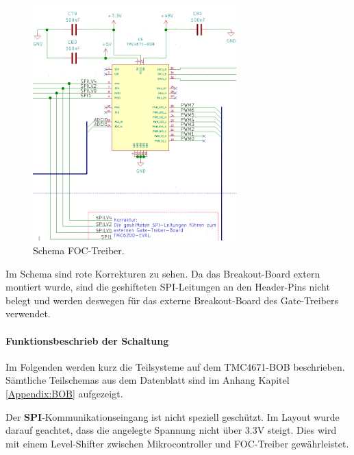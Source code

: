 \begin{figure}[H]
	\centering
	\includegraphics[width=0.7\textwidth]{graphics/Schema_FOC_Treiber}
	\caption{Schema FOC-Treiber.}
	\label{fig:Schema_FOC_Treiber}
\end{figure}

Im Schema sind rote Korrekturen zu sehen. Da das Breakout-Board extern montiert wurde, sind die geshifteten SPI-Leitungen an den Header-Pins nicht belegt und werden deswegen für das externe Breakout-Board des Gate-Treibers verwendet.

\newpage

\paragraph{Funktionsbeschrieb der Schaltung}\mbox{}


Im Folgenden werden kurz die Teilsysteme auf dem TMC4671-BOB beschrieben. Sämtliche Teilschemas aus dem Datenblatt sind im Anhang Kapitel \ref{Appendix:BOB} aufgezeigt.


Der \textbf{SPI}-Kommunikationseingang ist nicht speziell geschützt. Im Layout wurde darauf geachtet, dass die angelegte Spannung nicht über 3.3V steigt. Dies wird mit einem Level-Shifter zwischen Mikrocontroller und FOC-Treiber gewährleistet.

